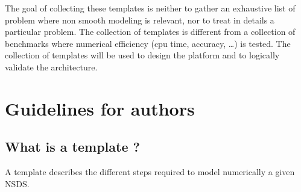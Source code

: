 \documentclass[10pt]{article}
\begin{document}
The goal of collecting these templates is neither to gather an exhaustive list of problem where non smooth modeling is relevant, nor to treat in details a  particular problem. The collection of templates is different from a collection of benchmarks where numerical efficiency (cpu time, accuracy, \ldots) is tested. The collection of templates will be used to design the platform and to logically validate the architecture.



\section{Guidelines for authors}



\subsection{What is a template ?}


A template describes the different steps required to model numerically a given NSDS.
\end{document}
